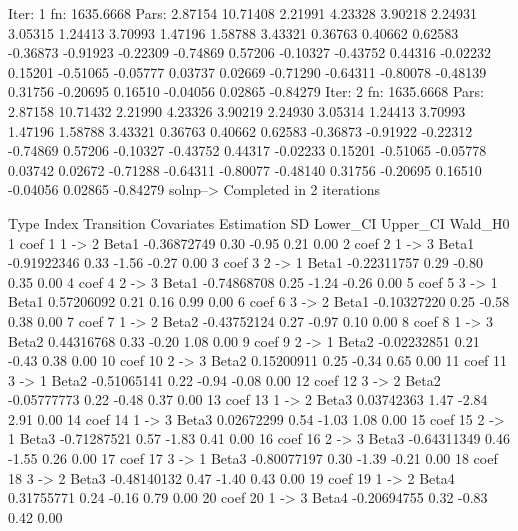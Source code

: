 \documentclass[11pt,a4paper]{article}
\begin{document}
\begin{Schunk}
\begin{Soutput}
Iter: 1 fn: 1635.6668	 Pars:   2.87154 10.71408  2.21991  4.23328  3.90218  2.24931  3.05315  1.24413  3.70993  1.47196  1.58788  3.43321  0.36763  0.40662  0.62583 -0.36873 -0.91923 -0.22309 -0.74869  0.57206 -0.10327 -0.43752  0.44316 -0.02232  0.15201 -0.51065 -0.05777  0.03737  0.02669 -0.71290 -0.64311 -0.80078 -0.48139  0.31756 -0.20695  0.16510 -0.04056  0.02865 -0.84279
Iter: 2 fn: 1635.6668	 Pars:   2.87158 10.71432  2.21990  4.23326  3.90219  2.24930  3.05314  1.24413  3.70993  1.47196  1.58788  3.43321  0.36763  0.40662  0.62583 -0.36873 -0.91922 -0.22312 -0.74869  0.57206 -0.10327 -0.43752  0.44317 -0.02233  0.15201 -0.51065 -0.05778  0.03742  0.02672 -0.71288 -0.64311 -0.80077 -0.48140  0.31756 -0.20695  0.16510 -0.04056  0.02865 -0.84279
solnp--> Completed in 2 iterations
\end{Soutput}
\begin{Soutput}
   Type Index Transition Covariates  Estimation   SD Lower_CI Upper_CI Wald_H0
1  coef     1     1 -> 2      Beta1 -0.36872749 0.30    -0.95     0.21    0.00
2  coef     2     1 -> 3      Beta1 -0.91922346 0.33    -1.56    -0.27    0.00
3  coef     3     2 -> 1      Beta1 -0.22311757 0.29    -0.80     0.35    0.00
4  coef     4     2 -> 3      Beta1 -0.74868708 0.25    -1.24    -0.26    0.00
5  coef     5     3 -> 1      Beta1  0.57206092 0.21     0.16     0.99    0.00
6  coef     6     3 -> 2      Beta1 -0.10327220 0.25    -0.58     0.38    0.00
7  coef     7     1 -> 2      Beta2 -0.43752124 0.27    -0.97     0.10    0.00
8  coef     8     1 -> 3      Beta2  0.44316768 0.33    -0.20     1.08    0.00
9  coef     9     2 -> 1      Beta2 -0.02232851 0.21    -0.43     0.38    0.00
10 coef    10     2 -> 3      Beta2  0.15200911 0.25    -0.34     0.65    0.00
11 coef    11     3 -> 1      Beta2 -0.51065141 0.22    -0.94    -0.08    0.00
12 coef    12     3 -> 2      Beta2 -0.05777773 0.22    -0.48     0.37    0.00
13 coef    13     1 -> 2      Beta3  0.03742363 1.47    -2.84     2.91    0.00
14 coef    14     1 -> 3      Beta3  0.02672299 0.54    -1.03     1.08    0.00
15 coef    15     2 -> 1      Beta3 -0.71287521 0.57    -1.83     0.41    0.00
16 coef    16     2 -> 3      Beta3 -0.64311349 0.46    -1.55     0.26    0.00
17 coef    17     3 -> 1      Beta3 -0.80077197 0.30    -1.39    -0.21    0.00
18 coef    18     3 -> 2      Beta3 -0.48140132 0.47    -1.40     0.43    0.00
19 coef    19     1 -> 2      Beta4  0.31755771 0.24    -0.16     0.79    0.00
20 coef    20     1 -> 3      Beta4 -0.20694755 0.32    -0.83     0.42    0.00

\end{Soutput}
\end{Schunk}
\end{document}
